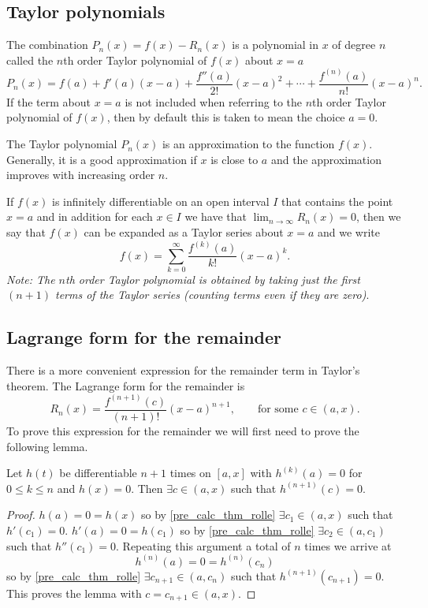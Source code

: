 \documentclass[10pt, a4paper]{article}
\begin{document}
\subsection{Taylor polynomials}
The combination $P_n(x) = f(x) - R_n(x)$ is a polynomial in $x$ of degree $n$ called the $n$th order Taylor polynomial of $f(x)$ about $x = a$
\[
P_n(x) = f(a) + f'(a)(x - a) + \frac{f''(a)}{2!}(x - a) ^ 2 + \dotsi + \frac{f ^ {(n)}(a)}{n!}(x - a) ^ n.
\]
If the term about $x = a$ is not included when referring to the $n$th order Taylor polynomial of $f(x)$,
then by default this is taken to mean the choice $a = 0$.

The Taylor polynomial $P_n(x)$ is an approximation to the function $f(x)$.
Generally,
it is a good approximation if $x$ is close to $a$ and the approximation improves with increasing order $n$.

If $f(x)$ is infinitely differentiable on an open interval $I$ that contains the point $x = a$ and in addition for each $x \in I$ we have that $\lim_{n \rightarrow \infty}R_n(x) = 0$,
then we say that $f(x)$ can be expanded as a Taylor series about $x = a$ and we write
\[
f(x) = \sum_{k = 0}^{\infty}\frac{f ^ {(k)}(a)}{k!}(x - a) ^ k.
\]
\textit{Note: The $n$th order Taylor polynomial is obtained by taking just the first $(n + 1)$ terms of the Taylor series
(counting terms even if they are zero)}.

\subsection{Lagrange form for the remainder}
There is a more convenient expression for the remainder term in Taylor's theorem.
The Lagrange form for the remainder is
\[
R_n(x) = \frac{f ^ {(n + 1)}(c)}{(n + 1)!}(x - a) ^ {n + 1},\qquad\text{for some } c \in (a, x).
\]
To prove this expression for the remainder we will first need to prove the following lemma.
\begin{lemma}
    Let $h(t)$ be differentiable $n + 1$ times on $[a, x]$ with $h ^ {(k)}(a) = 0$ for $0 \leq k \leq n$ and $h(x) = 0$.
    Then $\exists c \in (a, x)$ such that $h ^ {(n + 1)}(c) = 0$.

    \begin{proof}
        $h(a) = 0 = h(x)$ so by \autoref{pre_calc_thm_rolle} $\exists c_1 \in (a, x)$ such that $h'(c_1) = 0$.
        $h'(a) = 0 = h(c_1)$ so by \autoref{pre_calc_thm_rolle} $\exists c_2 \in (a, c_1)$ such that $h''(c_1) = 0$.
        Repeating this argument a total of $n$ times we arrive at
        \[
        h ^ {(n)}(a) = 0 = h ^ {(n)}(c_n)
        \]
        so by \autoref{pre_calc_thm_rolle} $\exists c_{n + 1} \in (a, c_n)$ such that $h ^ {(n + 1)}(c_{n + 1}) = 0$.
        This proves the lemma with $c = c_{n + 1} \in (a, x)$.
    \end{proof}
\end{lemma}
\end{document}
